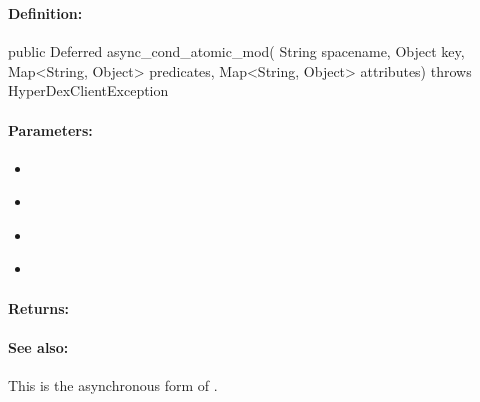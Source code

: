 \pagebreak
\subsubsection{}
\label{api:java:async_cond_atomic_mod}


\paragraph{Definition:}
\begin{javacode}
public Deferred async_cond_atomic_mod(
        String spacename,
        Object key,
        Map<String, Object> predicates,
        Map<String, Object> attributes) throws HyperDexClientException
\end{javacode}

\paragraph{Parameters:}
\begin{itemize}[noitemsep]
\item {}\\

\item {}\\

\item {}\\

\item {}\\

\end{itemize}

\paragraph{Returns:}


\paragraph{See also:}  This is the asynchronous form of .

\pagebreak
